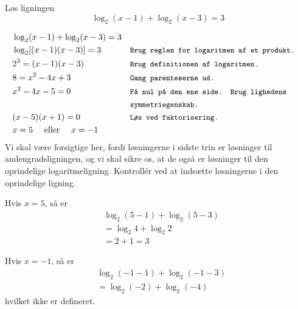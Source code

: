 \begin{example} Løs ligningen
    \begin{equation*}
\log _2(x-1)+\log _2(x-3)=3
\end{equation*}

\newpage

\begin{solution}

\begin{align*}
& \log _2(x-1)+\log _2(x-3)=3  \\
& \log _2[(x-1)(x-3)]=3 && \texttt{\small Brug reglen for logaritmen af et produkt.} \\
& 2^3=(x-1)(x-3) && \texttt{\small Brug definitionen af logaritmen.} \\
& 8=x^2-4 x+3 && \texttt{\small Gang parenteserne ud.}\\
& x^2-4 x-5=0 && \texttt{\small Få nul på den ene side. Brug lighedens }\\
&\vspace{-0.2cm}   && \texttt{\small symmetriegenskab.} \\
& (x-5)(x+1)=0 && \texttt{\small Løs ved faktorisering.} \\
& x=5 \quad \text{ eller } \quad x=-1
\end{align*}
Vi skal være forsigtige her, fordi løsningerne i sidste trin er løsninger til andengradsligningen, og vi skal sikre os, at de også er løsninger til den oprindelige logaritmeligning. Kontrollér ved at indsætte løsningerne i den oprindelige ligning.

\begin{minipage}[t]{0.45\textwidth}
Hvis $x=5$, så er
\[
\begin{aligned}
& \log _2(5-1)+\log _2(5-3) \\
& =\log _2 4+\log _2 2 \\
& =2+1=3
\end{aligned}
\]
\end{minipage}%
\hfill
\begin{minipage}[t]{0.45\textwidth}
Hvis $x=-1$, så er
\[
\begin{aligned}
& \log _2(-1-1)+\log _2(-1-3) \\
& =\log _2(-2)+\log _2(-4)
\end{aligned}
\]
hvilket ikke er defineret.
\end{minipage}

\end{solution}

\end{example}

